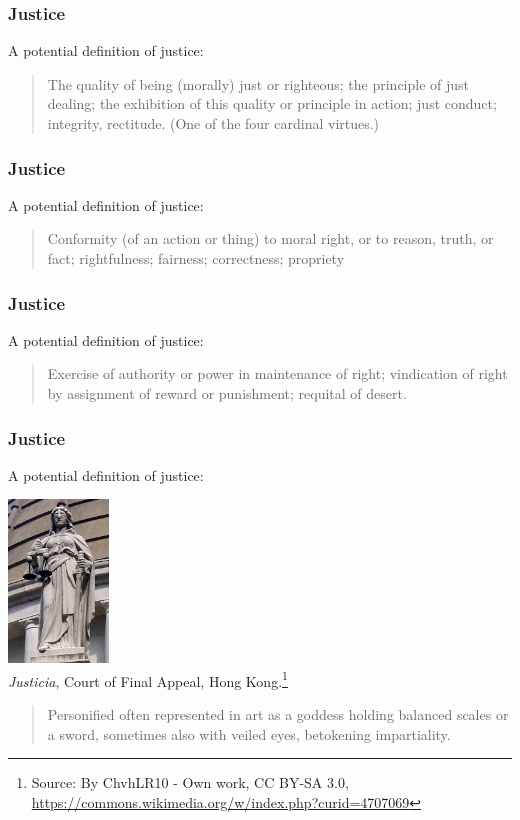 \begin{frame}
\frametitle{Justice}

A potential definition of justice:

\begin{quote}
The quality of being (morally) just or righteous; the principle of just dealing; the exhibition of this quality or principle in action; just conduct; integrity, rectitude. (One of the four cardinal virtues.)
\end{quote}

\end{frame}

\begin{frame}
\frametitle{Justice}

A potential definition of justice:

\begin{quote}
Conformity (of an action or thing) to moral right, or to reason, truth, or fact; rightfulness; fairness; correctness; propriety
\end{quote}

\end{frame}

\begin{frame}
\frametitle{Justice}

A potential definition of justice:

\begin{quote}
Exercise of authority or power in maintenance of right; vindication of right by assignment of reward or punishment; requital of desert.

\end{quote}

\end{frame}

\begin{frame}
\frametitle{Justice}

A potential definition of justice:

\begin{center}
\includegraphics[width=0.2\textwidth]{images/lady-justice.jpg}\\
{\scriptsize \textit{Justicia}, Court of Final Appeal, Hong Kong.\footnote{Source: By ChvhLR10 - Own work, CC BY-SA 3.0, \url{https://commons.wikimedia.org/w/index.php?curid=4707069}}}
\end{center}


\begin{quote}
Personified often represented in art as a goddess holding balanced scales or a sword, sometimes also with veiled eyes, betokening impartiality.
\end{quote}

\end{frame}



